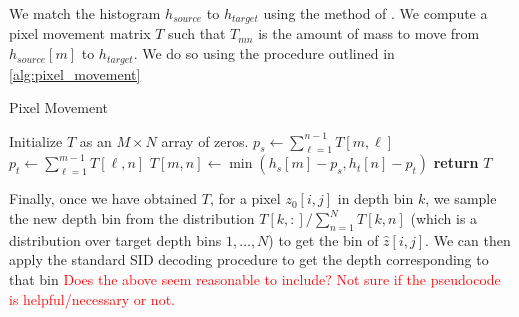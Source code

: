 We match the histogram $h_{source}$ to $h_{target}$ using the method of
\cite{Morovic2002}. We compute a pixel movement
matrix $T$ such that $T_{mn}$ is the amount of mass to move from $h_{source}[m]$
to $h_{target}$. We do so using the procedure outlined in \ref{alg:pixel_movement}

\begin{algorithm}[H]
 \caption{Pixel Movement} 
 \label{alg:ehm}
 \begin{algorithmic}
    \State Initialize $T$ as an $M \times N$ array of zeros.
        \State $p_s \gets \sum_{\ell=1}^{n-1} T[m, \ell]$
        \State $p_t \gets \sum_{\ell=1}^{m-1} T[\ell, n]$
        \State $T[m, n] \gets \min(h_s[m] - p_s, h_t[n] - p_t)$
      \EndFor
    \EndFor
    \State \textbf{return} $T$
  \EndProcedure
 \end{algorithmic}
\end{algorithm}

Finally, once we have obtained $T$, for a pixel $z_0[i, j]$ in depth bin $k$, we sample the new depth bin from the
distribution $T[k, :]/\sum_{n=1}^NT[k,n]$ (which is a distribution over target
depth bins $1,\ldots,N$) to get the bin of $\hat z[i,j]$. We can then apply the
standard SID decoding procedure to get the depth corresponding to that bin
\textcolor{red}{Does the above seem reasonable to include? Not sure if the
  pseudocode is helpful/necessary or not.}


